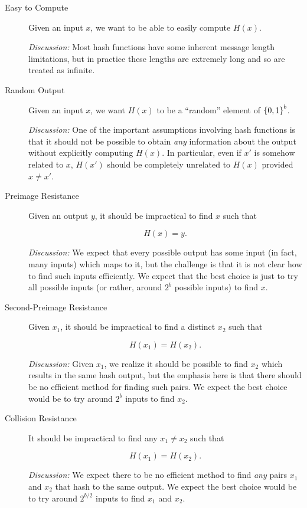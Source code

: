 \begin{description}
\item [Easy to Compute]
    Given an input $x$, we want to be able to easily compute $H(x)$.

    \emph{Discussion:} Most \glspl{hash function} have
        some inherent message length limitations,
        but in practice these lengths are extremely long
        and so are treated as infinite.
\item [Random Output]
    Given an input $x$, we want $H(x)$ to be a ``random'' element
    of $\left\{ 0,1 \right\}^{b}$.

    \emph{Discussion:} One of the important assumptions
        involving \glspl{hash function} is that it should not be possible
        to obtain \emph{any} information about the output
        without explicitly computing $H(x)$.
        In particular, even if $x'$ is somehow related to $x$,
        $H(x')$ should be completely unrelated to $H(x)$
        provided $x\ne x'$.
\item [Preimage Resistance]
    Given an output $y$, it should be impractical to find $x$ such that

\begin{equation}
    H(x) = y.
\end{equation}

    \emph{Discussion:} We expect that every possible output has some input
        (in fact, many inputs) which maps to it,
        but the challenge is that it is not clear how
        to find such inputs efficiently.
        We expect that the best choice is just to try all possible inputs
        (or rather, around $2^{b}$ possible inputs) to find $x$.

\item [Second-Preimage Resistance]
    Given $x_{1}$, it should be impractical to find a distinct $x_{2}$ such that

\begin{equation}
    H(x_{1}) = H(x_{2}).
\end{equation}

    \emph{Discussion:} Given $x_{1}$, we realize it should be possible
        to find $x_{2}$ which results in the same hash output,
        but the emphasis here is that there should be no
        efficient method for finding such pairs.
        We expect the best choice would be to try around $2^{b}$ inputs
        to find $x_{2}$.

\item [Collision Resistance]
    It should be impractical to find any $x_{1}\ne x_{2}$ such that

\begin{equation}
    H(x_{1}) = H(x_{2}).
\end{equation}

    \emph{Discussion:} We expect there to be no efficient method
        to find \emph{any} pairs $x_{1}$ and $x_{2}$ that hash to the
        same output.
        We expect the best choice would be to try around $2^{b/2}$ inputs
        to find $x_{1}$ and $x_{2}$.
\end{description}


